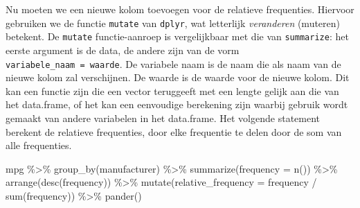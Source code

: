 \documentclass[]{tufte-book}
\newenvironment{Shaded}{}{}
\newcommand{\AttributeTok}[1]{\textcolor[rgb]{0.49,0.56,0.16}{#1}}
\newcommand{\FunctionTok}[1]{\textcolor[rgb]{0.02,0.16,0.49}{#1}}
\newcommand{\NormalTok}[1]{#1}
\newcommand{\SpecialCharTok}[1]{\textcolor[rgb]{0.25,0.44,0.63}{#1}}
\begin{document}
Nu moeten we een nieuwe kolom toevoegen voor de relatieve frequenties. Hiervoor gebruiken we de functie \texttt{mutate} van \texttt{dplyr}, wat letterlijk \emph{veranderen} (muteren) betekent. De \texttt{mutate} functie-aanroep is vergelijkbaar met die van \texttt{summarize}: het eerste argument is de data, de andere zijn van de vorm \texttt{variabele\_naam\ =\ waarde}. De variabele naam is de naam die als naam van de nieuwe kolom zal verschijnen. De waarde is de waarde voor de nieuwe kolom. Dit kan een functie zijn die een vector teruggeeft met een lengte gelijk aan die van het data.frame, of het kan een eenvoudige berekening zijn waarbij gebruik wordt gemaakt van andere variabelen in het data.frame. Het volgende statement berekent de relatieve frequenties, door elke frequentie te delen door de som van alle frequenties.

\begin{Shaded}
\begin{Highlighting}[]
\NormalTok{mpg }\SpecialCharTok{\%\textgreater{}\%}
  \FunctionTok{group\_by}\NormalTok{(manufacturer) }\SpecialCharTok{\%\textgreater{}\%}
  \FunctionTok{summarize}\NormalTok{(}\AttributeTok{frequency =} \FunctionTok{n}\NormalTok{()) }\SpecialCharTok{\%\textgreater{}\%}
  \FunctionTok{arrange}\NormalTok{(}\FunctionTok{desc}\NormalTok{(frequency)) }\SpecialCharTok{\%\textgreater{}\%}
  \FunctionTok{mutate}\NormalTok{(}\AttributeTok{relative\_frequency =}\NormalTok{ frequency }\SpecialCharTok{/} \FunctionTok{sum}\NormalTok{(frequency)) }\SpecialCharTok{\%\textgreater{}\%}
  \FunctionTok{pander}\NormalTok{()}
\end{Highlighting}
\end{Shaded}
\end{document}
